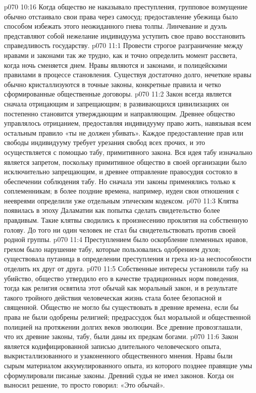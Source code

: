 \vs p070 10:16 Когда общество не наказывало преступления, групповое возмущение обычно отстаивало свои права через самосуд; предоставление убежища было способом избежать этого неожиданного гнева толпы. Линчевание и дуэль представляют собой нежелание индивидуума уступить свое право восстановить справедливость государству.
\vs p070 11:1 Провести строгое разграничение между нравами и законами так же трудно, как и точно определить момент рассвета, когда ночь сменяется днем. Нравы являются и законами, и полицейскими правилами в процессе становления. Существуя достаточно долго, нечеткие нравы обычно кристаллизуются в точные законы, конкретные правила и четко сформированные общественные договоры.
\vs p070 11:2 Закон всегда является сначала отрицающим и запрещающим; в развивающихся цивилизациях он постепенно становится утверждающим и направляющим. Древнее общество управлялось отрицанием, предоставляя индивидууму право жить, навязывая всем остальным правило «ты не должен убивать». Каждое предоставление прав или свободы индивидууму требует урезания свобод всех прочих, и это осуществляется с помощью табу, примитивного закона. Вся идея табу изначально является запретом, поскольку примитивное общество в своей организации было исключительно запрещающим, и древнее отправление правосудия состояло в обеспечении соблюдения табу. Но сначала эти законы применялись только к соплеменникам; в более поздние времена, например, иудеи свои отношения с неевреями определили уже отдельным этическим кодексом.
\vs p070 11:3 Клятва появилась в эпоху Даламатии как попытка сделать свидетельство более правдивым. Такие клятвы сводились к произнесению проклятия на собственную голову. До того ни один человек не стал бы свидетельствовать против своей родной группы.
\vs p070 11:4 \pc Преступлением было оскорбление племенных нравов, грехом было нарушение табу, которые пользовались одобрением духов; существовала путаница в определении преступления и греха из\hyp{}за неспособности отделить их друг от друга.
\vs p070 11:5 Собственные интересы установили табу на убийство, общество утвердило его в качестве традиционных норм поведения, тогда как религия освятила этот обычай как моральный закон, и в результате такого тройного действия человеческая жизнь стала более безопасной и священной. Общество не могло бы существовать в древние времена, если бы права не были одобрены религией; предрассудок был моральной и общественной полицией на протяжении долгих веков эволюции. Все древние провозглашали, что их древние законы, табу, были даны их предкам богами.
\vs p070 11:6 Закон является кодифицированной записью длительного человеческого опыта, выкристаллизованного и узаконенного общественного мнения. Нравы были сырым материалом аккумулированного опыта, из которого позднее правящие умы сформулировали писаные законы. Древний судья не имел законов. Когда он выносил решение, то просто говорил: «Это обычай».
